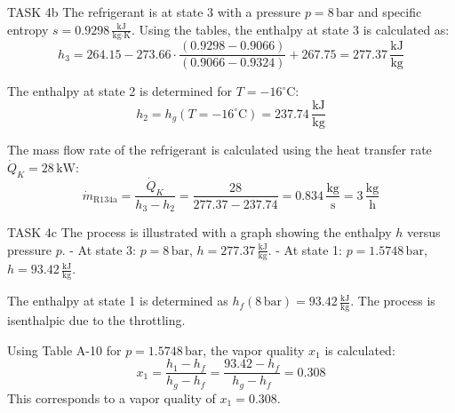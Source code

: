 TASK 4b  
The refrigerant is at state 3 with a pressure \( p = 8 \, \text{bar} \) and specific entropy \( s = 0.9298 \, \frac{\text{kJ}}{\text{kg·K}} \). Using the tables, the enthalpy at state 3 is calculated as:  
\[
h_3 = 264.15 - 273.66 \cdot \frac{(0.9298 - 0.9066)}{(0.9066 - 0.9324)} + 267.75 = 277.37 \, \frac{\text{kJ}}{\text{kg}}
\]

The enthalpy at state 2 is determined for \( T = -16^\circ \text{C} \):  
\[
h_2 = h_g(T = -16^\circ \text{C}) = 237.74 \, \frac{\text{kJ}}{\text{kg}}
\]

The mass flow rate of the refrigerant is calculated using the heat transfer rate \( \dot{Q}_K = 28 \, \text{kW} \):  
\[
\dot{m}_{\text{R134a}} = \frac{\dot{Q}_K}{h_3 - h_2} = \frac{28}{277.37 - 237.74} = 0.834 \, \frac{\text{kg}}{\text{s}} = 3 \, \frac{\text{kg}}{\text{h}}
\]

TASK 4c  
The process is illustrated with a graph showing the enthalpy \( h \) versus pressure \( p \).  
- At state 3: \( p = 8 \, \text{bar} \), \( h = 277.37 \, \frac{\text{kJ}}{\text{kg}} \).  
- At state 1: \( p = 1.5748 \, \text{bar} \), \( h = 93.42 \, \frac{\text{kJ}}{\text{kg}} \).  

The enthalpy at state 1 is determined as \( h_f(8 \, \text{bar}) = 93.42 \, \frac{\text{kJ}}{\text{kg}} \). The process is isenthalpic due to the throttling.

Using Table A-10 for \( p = 1.5748 \, \text{bar} \), the vapor quality \( x_1 \) is calculated:  
\[
x_1 = \frac{h_1 - h_f}{h_g - h_f} = \frac{93.42 - h_f}{h_g - h_f} = 0.308
\]  
This corresponds to a vapor quality of \( x_1 = 0.308 \).